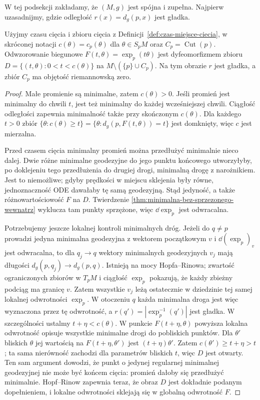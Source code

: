W tej podsekcji zakładamy, że $(M,g)$ jest spójna
i zupełna. Najpierw uzasadnijmy, gdzie odległość
$r(x)=d_g(p,x)$ jest gładka.

\begin{lemat}
\label{lem:czas-ciecia-polar}
Użyjmy czasu cięcia i zbioru cięcia z
Definicji~\ref{def:czas-miejsce-ciecia}, w skróconej notacji
$c(\theta)=c_p(\theta)$ dla $\theta\in S_pM$
oraz $C_p=\operatorname{Cut}(p)$.
Odwzorowanie biegunowe $F(t,\theta)=\exp_p(t\theta)$
jest dyfeomorfizmem zbioru
$D=\{(t,\theta):0<t<c(\theta)\}$ na
$M\setminus(\{p\}\cup C_p)$. Na tym obrazie $r$ jest
gładka, a zbiór $C_p$ ma objętość riemannowską zero.
\end{lemat}
\begin{proof}
Małe promienie są minimalne, zatem $c(\theta)>0$.
Jeśli promień jest minimalny do chwili $t$, jest też
minimalny do każdej wcześniejszej chwili. Ciągłość
odległości zapewnia minimalność także przy skończonym
$c(\theta)$. Dla każdego $t>0$ zbiór
$\{\theta:c(\theta)\geq t\}
=\{\theta:d_g(p,F(t,\theta))=t\}$ jest domknięty,
więc $c$ jest mierzalna.

Przed czasem cięcia minimalny promień można przedłużyć
minimalnie nieco dalej. Dwie różne minimalne geodezyjne
do jego punktu końcowego utworzyłyby, po doklejeniu
tego przedłużenia do drugiej drogi, minimalną drogę
z narożnikiem. Jest to niemożliwe; gdyby prędkości
w miejscu sklejenia były równe, jednoznaczność ODE
dawałaby tę samą geodezyjną. Stąd jedyność, a także
różnowartościowość $F$ na $D$. Twierdzenie
\ref{thm:minimalna-bez-sprzezonego-wewnatrz} wyklucza
tam punkty sprzężone, więc $\dd\exp_p$ jest odwracalna.

Potrzebujemy jeszcze lokalnej kontroli minimalnych dróg.
Jeżeli do $q\ne p$ prowadzi jedyna minimalna geodezyjna
z wektorem początkowym $v$ i $\dd(\exp_p)_v$ jest
odwracalna, to dla $q_j\to q$ wektory minimalnych
geodezyjnych $v_j$ mają długości $d_g(p,q_j)\to d_g(p,q)$.
Istnieją na mocy Hopfa--Rinowa; zwartość ograniczonych
zbiorów w $T_pM$ i ciągłość $\exp_p$ pokazują, że każdy
zbieżny podciąg ma granicę $v$. Zatem wszystkie $v_j$
leżą ostatecznie w dziedzinie tej samej lokalnej
odwrotności $\exp_p$. W otoczeniu $q$ każda minimalna
droga jest więc wyznaczona przez tę odwrotność,
a $r(q')=|\exp_p^{-1}(q')|$ jest gładka.
W szczególności ustalmy $t+\eta<c(\theta)$.
W punkcie $F(t+\eta,\theta)$ powyższa lokalna odwrotność
opisuje wszystkie minimalne drogi do pobliskich punktów.
Dla $\theta'$ bliskich $\theta$ jej wartością na
$F(t+\eta,\theta')$ jest $(t+\eta)\theta'$.
Zatem $c(\theta')\geq t+\eta>t$; ta sama nierówność
zachodzi dla parametrów bliskich $t$, więc $D$ jest otwarty.
Ten sam argument dowodzi, że punkt
o jedynej regularnej minimalnej geodezyjnej nie może
być końcem cięcia: promień dałoby się przedłużyć minimalnie.
Hopf--Rinow zapewnia teraz, że obraz $D$ jest dokładnie
podanym dopełnieniem, i lokalne odwrotności sklejają
się w globalną odwrotność $F$.


\end{proof}
